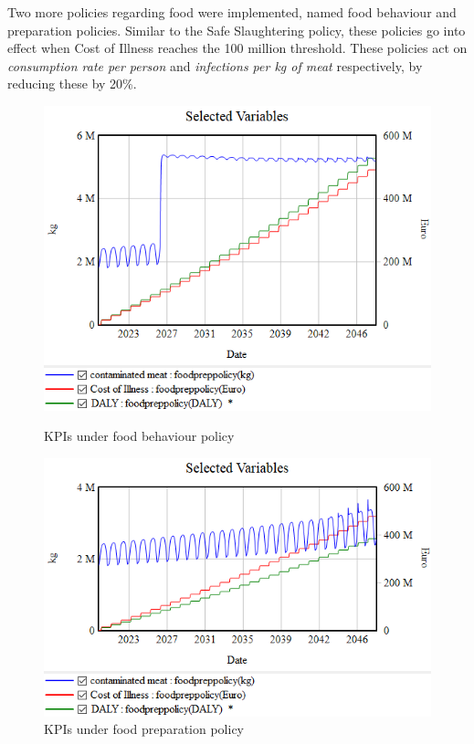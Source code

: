 Two more policies regarding food were implemented, named food behaviour and preparation policies. Similar to the Safe Slaughtering policy, these policies go into effect when Cost of Illness reaches the 100 million threshold. These policies act on
\textit{consumption rate per person} and \textit{infections per kg of meat} respectively, by reducing these by 20\%.  

\begin{figure}[h!]
    \centering
    \begin{minipage}{0.45\textwidth}
        \centering
        \includegraphics[width=1\textwidth]{images/foodbehaviourpolicy.png} 
        \caption{KPIs under food behaviour policy}
        \label{fig:foodbehav}
    \end{minipage}\hfill
    \begin{minipage}{0.45\textwidth}
        \centering
        \includegraphics[width=1\textwidth]{images/foodpreparationpolicy.png}
        \caption{KPIs under food preparation policy}
        \label{fig:foodprep}
    \end{minipage}
\end{figure}

